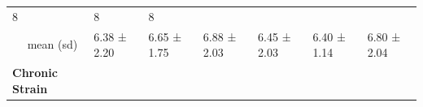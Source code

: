 \documentclass[
  english,
  man,floatsintext]{apa6}
\begin{document}
\begin{longtable}[]{@{}lllllll@{}}
\begin{minipage}[t]{0.12\columnwidth}
8\strut
\end{minipage} & \begin{minipage}[t]{0.10\columnwidth}\raggedright
8\strut
\end{minipage} & \begin{minipage}[t]{0.11\columnwidth}\raggedright
8\strut
\end{minipage}\tabularnewline
\begin{minipage}[t]{0.14\columnwidth}\raggedright
~~ mean (sd)\strut
\end{minipage} & \begin{minipage}[t]{0.11\columnwidth}\raggedright
6.38 ± 2.20\strut
\end{minipage} & \begin{minipage}[t]{0.12\columnwidth}\raggedright
6.65 ± 1.75\strut
\end{minipage} & \begin{minipage}[t]{0.10\columnwidth}\raggedright
6.88 ± 2.03\strut
\end{minipage} & \begin{minipage}[t]{0.12\columnwidth}\raggedright
6.45 ± 2.03\strut
\end{minipage} & \begin{minipage}[t]{0.10\columnwidth}\raggedright
6.40 ± 1.14\strut
\end{minipage} & \begin{minipage}[t]{0.11\columnwidth}\raggedright
6.80 ± 2.04\strut
\end{minipage}\tabularnewline
\begin{minipage}[t]{0.14\columnwidth}\raggedright
\textbf{Chronic Strain}\strut
\end{minipage} & \begin{minipage}[t]{0.11\columnwidth}\raggedright
~~\strut
\end{minipage} & \begin{minipage}[t]{0.12\columnwidth}\raggedright
~~\strut
\end{minipage} & \begin{minipage}[t]{0.10\columnwidth}\raggedright
~~\strut
\end{minipage} & \begin{minipage}[t]{0.12\columnwidth}\raggedright
~~\strut
\end{minipage} & \begin{minipage}[t]{0.10\columnwidth}\raggedright
~~\strut
\end{minipage} & \begin{minipage}[t]{0.11\columnwidth}\raggedright

\end{minipage}
\end{longtable}
\end{document}

